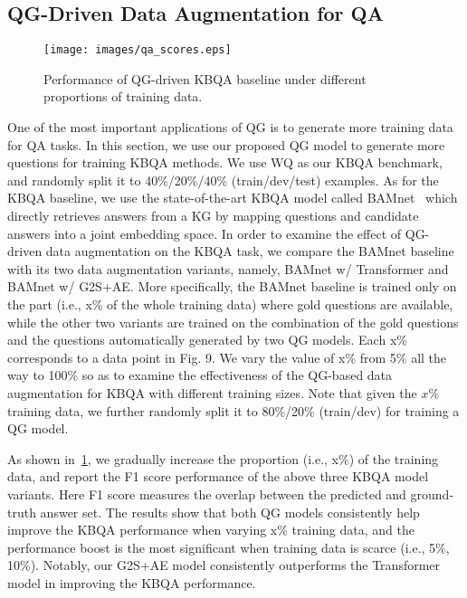 \documentclass[journal]{IEEEtran}
\begin{document}
\subsection{QG-Driven Data Augmentation for QA}

\begin{figure}[!htb]
\vspace{-1mm}
  \centering
    \texttt{[image: images/qa\_scores.eps]}
  \caption{Performance of QG-driven KBQA baseline under different proportions of training data.}
  \label{fig:qa_results}
  \vspace{-3mm}
\end{figure}


One of the most important applications of QG is to generate more training data for QA tasks. 
In this section, we use our proposed QG model to generate more questions for training KBQA methods.
We use WQ as our KBQA benchmark, and randomly split it to 40\%/20\%/40\% (train/dev/test) examples.
As for the KBQA baseline, we use the state-of-the-art KBQA model called BAMnet~\cite{chen2019bidirectional} which directly retrieves answers from a KG by mapping questions and candidate answers into a joint embedding space.
In order to examine the effect of QG-driven data augmentation on the KBQA task, 
we compare the BAMnet baseline with its two data augmentation variants, namely, BAMnet w/ Transformer and BAMnet w/ G2S+AE.
More specifically, the BAMnet baseline is trained only on the part 
(i.e., x\% of the whole training data) 
where gold questions are available, while the other two variants are trained on the combination of the gold questions and the questions automatically generated by two QG models.
Each x\% corresponds to a data point in Fig. 9. We vary the value of x\% from 5\% all the way to 100\% so as to examine the effectiveness of the QG-based data augmentation for KBQA with different training sizes.
Note that given the $x$\% training data, we further randomly split it to 80\%/20\% (train/dev) for training a QG model.



As shown in~\cref{fig:qa_results}, we gradually increase the proportion (i.e., x\%) of the training data, and report the F1 score performance of the above three KBQA model variants.
Here F1 score measures the overlap between the predicted and ground-truth answer set.
The results show that both QG models consistently help improve the KBQA performance when varying x\% training data, and the performance boost is the most significant when training data is scarce (i.e., 5\%, 10\%).
Notably, our G2S+AE model consistently outperforms the Transformer model in improving the KBQA performance. 
\end{document}
